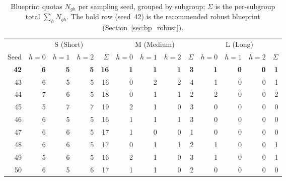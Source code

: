 \begin{table}[h]
  \centering
  \caption{Blueprint quotas $N_{gh}$ per sampling seed, grouped by subgroup;
           $\Sigma$ is the per-subgroup total $\sum_h N_{gh}$.
           The bold row (seed~42) is the recommended robust blueprint
           (Section~\ref{sec:bp_robust}).}
  \label{tab:bp_seeds_sessions}
  \setlength{\tabcolsep}{4pt}
  \begin{tabular}{r|rrrr|rrrr|rrrr}
    \toprule
    & \multicolumn{4}{c|}{S (Short)} & \multicolumn{4}{c|}{M (Medium)} & \multicolumn{4}{c}{L (Long)} \\
    Seed & $h{=}0$ & $h{=}1$ & $h{=}2$ & $\Sigma$
         & $h{=}0$ & $h{=}1$ & $h{=}2$ & $\Sigma$
         & $h{=}0$ & $h{=}1$ & $h{=}2$ & $\Sigma$ \\
    \midrule
    \textbf{42} & \textbf{6} & \textbf{5} & \textbf{5} & \textbf{16}
                & \textbf{1} & \textbf{1} & \textbf{1} & \textbf{3}
                & \textbf{1} & \textbf{0} & \textbf{0} & \textbf{1} \\
    43 & 6 & 5 & 5 & 16 & 0 & 2 & 2 & 4 & 1 & 0 & 0 & 1 \\
    44 & 7 & 6 & 5 & 18 & 0 & 1 & 1 & 2 & 2 & 0 & 0 & 2 \\
    45 & 5 & 7 & 7 & 19 & 2 & 1 & 0 & 3 & 0 & 0 & 0 & 0 \\
    46 & 6 & 5 & 5 & 16 & 1 & 1 & 1 & 3 & 0 & 0 & 0 & 0 \\
    47 & 6 & 6 & 5 & 17 & 1 & 0 & 0 & 1 & 0 & 0 & 0 & 0 \\
    48 & 6 & 6 & 5 & 17 & 0 & 1 & 1 & 2 & 1 & 0 & 0 & 1 \\
    49 & 5 & 6 & 5 & 16 & 2 & 1 & 0 & 3 & 1 & 0 & 0 & 1 \\
    50 & 6 & 5 & 6 & 17 & 1 & 1 & 0 & 2 & 0 & 0 & 0 & 0 \\
    \bottomrule
  \end{tabular}
\end{table}